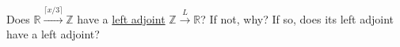
Does $\mathbb{R}\xrightarrow{\lceil x/3 \rceil}\mathbb{Z}$ have a \href{doc/1 math/Seven Sketches in Compositionality/Chapter 1: Generative Effects/6 Galois connections/1 Definition and examples/Galois connection}{left adjoint} $\mathbb{Z} \xrightarrow{L} \mathbb{R}$? If not, why? If so, does its left adjoint have a left adjoint?